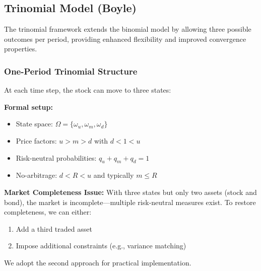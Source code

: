 \documentclass[10pt,twocolumn]{article}
\begin{document}
\subsection{Trinomial Model (Boyle)}

The trinomial framework extends the binomial model by allowing three possible outcomes per period, providing enhanced flexibility and improved convergence properties.

\subsubsection{One-Period Trinomial Structure}

At each time step, the stock can move to three states:

\begin{center}
\end{center}

\textbf{Formal setup:}
\begin{itemize}[leftmargin=*,itemsep=2pt]
    \item State space: $\Omega = \{\omega_u, \omega_m, \omega_d\}$
    \item Price factors: $u > m > d$ with $d < 1 < u$
    \item Risk-neutral probabilities: $q_u + q_m + q_d = 1$
    \item No-arbitrage: $d < R < u$ and typically $m \leq R$
\end{itemize}

\begin{notebox}
\textbf{Market Completeness Issue:} With three states but only two assets (stock and bond), the market is incomplete---multiple risk-neutral measures exist. To restore completeness, we can either:
\begin{enumerate}[itemsep=1pt]
    \item Add a third traded asset
    \item Impose additional constraints (e.g., variance matching)
\end{enumerate}
We adopt the second approach for practical implementation.
\end{notebox}
\end{document}
